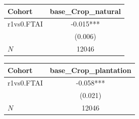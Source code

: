 {
\def\sym#1{\ifmmode^{#1}\else\(^{#1}\)\fi}
\begin{tabular}{l*{1}{c}}
\toprule
Cohort    &base\_Crop\_natural   \\
\midrule
r1vs0.FTAI&   -0.015***\\
          &  (0.006)   \\
\midrule
\(N\)     &    12046   \\
\bottomrule
\end{tabular}
}
{
\def\sym#1{\ifmmode^{#1}\else\(^{#1}\)\fi}
\begin{tabular}{l*{1}{c}}
\toprule
Cohort    &base\_Crop\_plantation   \\
\midrule
r1vs0.FTAI&   -0.058***\\
          &  (0.021)   \\
\midrule
\(N\)     &    12046   \\
\bottomrule
\end{tabular}
}
